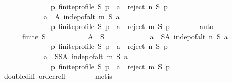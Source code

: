 \begin{isabellebody}
\ \ \ \ \ \ \ \ \ \ \ \ \ \ {\isacharparenleft}{\kern0pt}{\isasymforall}p{\isachardot}{\kern0pt}\ finite{\isacharunderscore}{\kern0pt}profile\ S\ p\ {\isasymlongrightarrow}\ a\ {\isasymin}\ reject\ n\ S\ p{\isacharparenright}{\kern0pt}{\isacharparenright}{\kern0pt}\ {\isasymand}\isanewline
\ \ \ \ \ \ \ \ \ \ \ \ {\isacharparenleft}{\kern0pt}{\isasymforall}a\ {\isasymin}\ A{\isachardot}{\kern0pt}\ indep{\isacharunderscore}{\kern0pt}of{\isacharunderscore}{\kern0pt}alt\ m\ S\ a\ {\isasymand}\isanewline
\ \ \ \ \ \ \ \ \ \ \ \ \ \ {\isacharparenleft}{\kern0pt}{\isasymforall}p{\isachardot}{\kern0pt}\ finite{\isacharunderscore}{\kern0pt}profile\ S\ p\ {\isasymlongrightarrow}\ a\ {\isasymin}\ reject\ m\ S\ p{\isacharparenright}{\kern0pt}{\isacharparenright}{\kern0pt}{\isacharparenright}{\kern0pt}{\isachardoublequoteclose}\isanewline
\ \ \ \ \ \ \isamarkupfalse%
\ auto\isanewline
\ \ \ \ \isamarkupfalse%
\isanewline
\ \ \ \ \ \ {\isachardoublequoteopen}finite\ S\ {\isasymlongrightarrow}\isanewline
\ \ \ \ \ \ \ \ \ \ {\isacharparenleft}{\kern0pt}{\isasymexists}A\ {\isasymsubseteq}\ S{\isachardot}{\kern0pt}\isanewline
\ \ \ \ \ \ \ \ \ \ \ \ {\isacharparenleft}{\kern0pt}{\isasymforall}a\ {\isasymin}\ S{\isacharminus}{\kern0pt}A{\isachardot}{\kern0pt}\ indep{\isacharunderscore}{\kern0pt}of{\isacharunderscore}{\kern0pt}alt\ n\ S\ a\ {\isasymand}\isanewline
\ \ \ \ \ \ \ \ \ \ \ \ \ \ {\isacharparenleft}{\kern0pt}{\isasymforall}p{\isachardot}{\kern0pt}\ finite{\isacharunderscore}{\kern0pt}profile\ S\ p\ {\isasymlongrightarrow}\ a\ {\isasymin}\ reject\ n\ S\ p{\isacharparenright}{\kern0pt}{\isacharparenright}{\kern0pt}\ {\isasymand}\isanewline
\ \ \ \ \ \ \ \ \ \ \ \ {\isacharparenleft}{\kern0pt}{\isasymforall}a\ {\isasymin}\ S{\isacharminus}{\kern0pt}{\isacharparenleft}{\kern0pt}S{\isacharminus}{\kern0pt}A{\isacharparenright}{\kern0pt}{\isachardot}{\kern0pt}\ indep{\isacharunderscore}{\kern0pt}of{\isacharunderscore}{\kern0pt}alt\ m\ S\ a\ {\isasymand}\isanewline
\ \ \ \ \ \ \ \ \ \ \ \ \ \ {\isacharparenleft}{\kern0pt}{\isasymforall}p{\isachardot}{\kern0pt}\ finite{\isacharunderscore}{\kern0pt}profile\ S\ p\ {\isasymlongrightarrow}\ a\ {\isasymin}\ reject\ m\ S\ p{\isacharparenright}{\kern0pt}{\isacharparenright}{\kern0pt}{\isacharparenright}{\kern0pt}{\isachardoublequoteclose}\isanewline
\ \ \ \ \ \ \isamarkupfalse%
\ double{\isacharunderscore}{\kern0pt}diff\ order{\isacharunderscore}{\kern0pt}refl\isanewline
\ \ \ \ \ \ \isamarkupfalse%
\ metis\isanewline
\ \ \ \ \isamarkupfalse%
\isanewline

\end{isabellebody}
